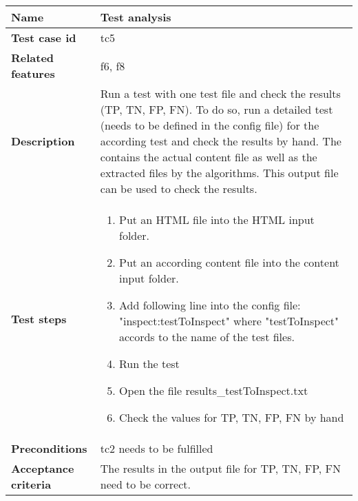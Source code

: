 	\begin{tabular}{ | p{3.5cm} | p{12cm} |}
	\hline
	\textbf{Name} 					& Test analysis 		 		\\ 	\hline
	\textbf{Test case id} 			& tc5 							\\ 	\hline
	\textbf{Related features}		& f6, f8							\\ 	\hline
	\textbf{Description} 			& Run a test with one test file and check the results (TP, TN, FP, FN). To do so, run a detailed test (needs to be defined in the config file) for the according test and check the results by hand. The contains the actual content file as well as the extracted files by the algorithms. This output file can be used to check the results. 	\\ 	\hline
	\textbf{Test steps} 			& 	\begin{enumerate}
											\item{Put an HTML file into the HTML input folder.}
											\item{Put an according content file into the content input folder.}
											\item{Add following line into the config file: "inspect:testToInspect" where "testToInspect" accords to the name of the test files.}
											\item{Run the test}
											\item{Open the file results\_testToInspect.txt}
											\item{Check the values for TP, TN, FP, FN by hand}
										\end{enumerate}
																\\ 	\hline
	\textbf{Preconditions} 			& tc2 needs to be fulfilled	\\ 	\hline
	\textbf{Acceptance criteria} 	& The results in the output file for TP, TN, FP, FN need to be correct.						\\ 	\hline
	\end{tabular} \\





